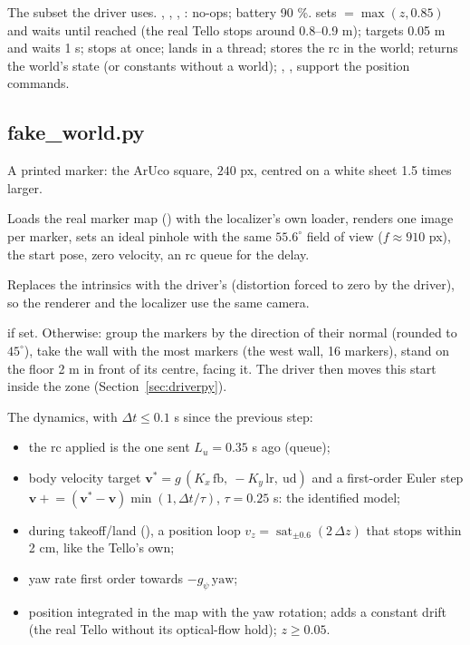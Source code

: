 The  subset the driver uses. , , , : no-ops;
battery 90 \%.  sets  $=\max(z, 0.85)$ and waits until reached (the real Tello
stops around 0.8--0.9 m);  targets 0.05 m and waits 1 s;  stops at once;
 lands in a thread;  stores the rc in the
world;  returns the world's state (or constants without a world); ,
,  support the position commands.

\subsection{fake\_world.py}

A printed marker: the ArUco square, $240$ px, centred on a white sheet 1.5 times larger.

Loads the real marker map () with the localizer's own loader, renders one image per
marker, sets an ideal pinhole with the same $55.6^\circ$ field of view ($f\approx910$ px), the start pose, zero
velocity, an rc queue for the delay.

Replaces the intrinsics with the driver's  (distortion forced to zero by the driver), so the
renderer and the localizer use the same camera.

 if set. Otherwise: group the markers by the direction of their normal (rounded to
$45^\circ$), take the wall with the most markers (the west wall, 16 markers), stand on the floor 2 m in front of
its centre, facing it. The driver then moves this start inside the zone (Section~\ref{sec:driverpy}).

The dynamics, with $\Delta t \le 0.1$ s since the previous step:
\begin{itemize}[itemsep=1pt]
\item the rc applied is the one sent $L_u = 0.35$ s ago (queue);
\item body velocity target $\bm v^\ast = g\,(K_x\,\text{fb},\ -K_y\,\text{lr},\ \text{ud})$ and a first-order
Euler step $\bm v \mathrel{+}= (\bm v^\ast-\bm v)\min(1, \Delta t/\tau)$, $\tau=0.25$ s: the identified model;
\item during takeoff/land (), a position loop $v_z = \operatorname{sat}_{\pm0.6}(2\,\Delta z)$
that stops within 2 cm, like the Tello's own;
\item yaw rate first order towards $-g_\psi\,\text{yaw}$;
\item position integrated in the map with the yaw rotation;  adds a constant drift (the
real Tello without its optical-flow hold); $z\ge0.05$.
\end{itemize}

